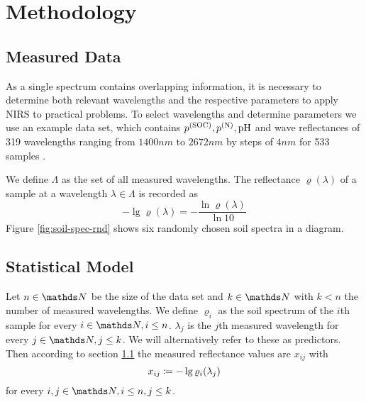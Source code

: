 \section{Methodology}
\label{sec:methodology}
	
	\subsection{Measured Data}
	\label{ssec:measured-data}
	
		As a single spectrum contains overlapping information, it is necessary to determine both relevant wavelengths and the respective parameters to apply NIRS to practical problems.
		To select wavelengths and determine parameters we use an example data set, which contains $p^{\mathrm{(SOC)}},p^{\mathrm{(N)}},\mathrm{pH}$ and wave reflectances of 319 wavelengths ranging from $1400 \unit{nm}$ to $2672 \unit{nm}$ by steps of $4 \unit{nm}$ for 533 samples \cite{don:a}.

		We define $\Lambda$ as the set of all measured wavelengths. The reflectance $\varrho(\lambda)$ of a sample at a wavelength $\lambda \in \Lambda$ is recorded as
		\[
			-\lg \varrho(\lambda) = -\frac{\ln \varrho(\lambda)}{\ln 10}
		\]
		Figure \ref{fig:soil-spec-rnd} shows six randomly chosen soil spectra in a diagram.
		\begin{figure*}
			\centering
			
			\caption{Six near infrared soil spectra of randomly chosen soil samples obtained from the data set, where $\lambda$ is the wavelength and $\rho(\lambda)$ the corresponding reflectance and each colour refers to one sample}
			\label{fig:soil-spec-rnd}
		\end{figure*}
		
	

	\subsection{Statistical Model}
	\label{ssec:statistical-model}
	
		Let $n\in\SN$ be the size of the data set and $k\in\SN$ with $k< n$ the number of measured wavelengths. We define
		$\varrho_i$ as the soil spectrum of the $i$th sample for every $i\in\SN,i\leq n$.
		$\lambda_j$ is the $j$th measured wavelength for every $j\in\SN,j\leq k$. We will alternatively refer to these as predictors.%
		Then according to section \ref{ssec:measured-data} the measured reflectance values are $x_{ij}$ with
		\[
			x_{ij} \coloneqq -\lg \varrho_i(\lambda_j)
		\]
		for every $i,j\in\SN,i\leq n,j\leq k$.
		
